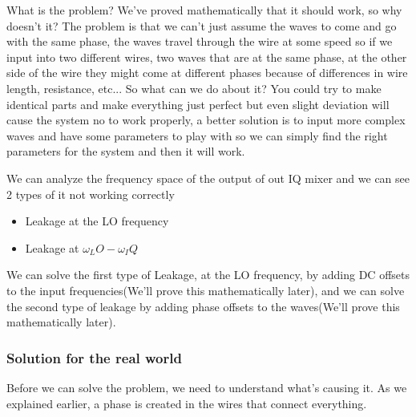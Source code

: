 \documentclass[english, a4paper, 12pt, twoside]{article}
\numberwithin{equation}{section} %
\begin{document}
What is the problem? We've proved mathematically that it should work, so why doesn't it? The problem is that we can't just assume the waves to come and go with the same phase, the waves travel through the wire at some speed so if we input into two different wires, two waves that are at the same phase, at the other side of the wire they might come at different phases because of differences in wire length, resistance, etc... So what can we do about it? You could try to make identical parts and make everything just perfect but even slight deviation will cause the system no to work properly, a better solution is to input more complex waves and have some parameters to play with so we can simply find the right parameters for the system and then it will work.%

We can analyze the frequency space of the output of out IQ mixer and we can see 2 types of it not working correctly
\begin{itemize}
  \item Leakage at the LO frequency
  \item Leakage at \(\omega_LO - \omega_IQ\)
\end{itemize}
We can solve the first type of Leakage, at the LO frequency, by adding DC offsets to the input frequencies(We'll prove this mathematically later), and we can solve the second type of leakage by adding phase offsets to the waves(We'll prove this mathematically later).
\subsubsection{Solution for the real world} \label{sec:solution_real_world}
Before we can solve the problem, we need to understand what's causing it. As we explained earlier, a phase  is created  in the wires that connect everything.
\end{document}
